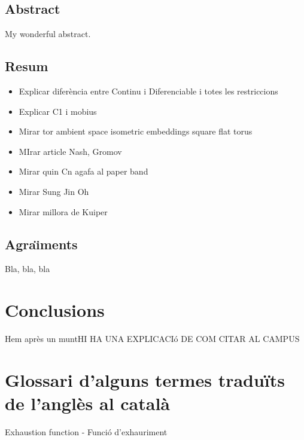 \documentclass[11pt,a4paper,openright,oneside]{book}
\numberwithin{equation}{section}
\theoremstyle{definition}
\begin{document}
\newpage
{} 

\section*{Abstract}
My wonderful abstract.

\section*{Resum}
\begin{itemize}
    \item Explicar diferència entre Continu i Diferenciable i totes les restriccions
    \item Explicar C1 i mobius
    \item Mirar tor ambient space isometric embeddings square flat torus
    \item MIrar article Nash, Gromov
    \item Mirar quin Cn agafa al paper band
    \item Mirar Sung Jin Oh
    \item Mirar millora de Kuiper
\end{itemize}

\newpage 


\section*{Agra\"{\i}ments}

Bla, bla, bla
\newpage

\tableofcontents

\newpage








%

\chapter{Conclusions}

Hem après un muntHI HA UNA EXPLICACIó DE COM CITAR AL CAMPUS

\normalfont

\newpage
\chapter{Glossari d'alguns termes traduïts de l'anglès al català}
Exhaustion function - Funció d'exhauriment
\end{document}
